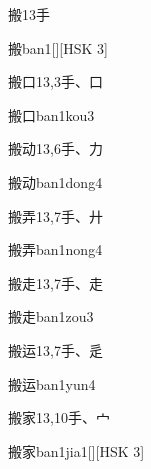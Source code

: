 \begin{entry}{搬}{13}{⼿}
  \begin{phonetics}{搬}{ban1}[][HSK 3]
  \end{phonetics}
\end{entry}

\begin{entry}{搬口}{13,3}{⼿、⼝}
  \begin{phonetics}{搬口}{ban1kou3}
  \end{phonetics}
\end{entry}

\begin{entry}{搬动}{13,6}{⼿、⼒}
  \begin{phonetics}{搬动}{ban1dong4}
  \end{phonetics}
\end{entry}

\begin{entry}{搬弄}{13,7}{⼿、⼶}
  \begin{phonetics}{搬弄}{ban1nong4}
  \end{phonetics}
\end{entry}

\begin{entry}{搬走}{13,7}{⼿、⾛}
  \begin{phonetics}{搬走}{ban1zou3}
  \end{phonetics}
\end{entry}

\begin{entry}{搬运}{13,7}{⼿、⾡}
  \begin{phonetics}{搬运}{ban1yun4}
  \end{phonetics}
\end{entry}

\begin{entry}{搬家}{13,10}{⼿、⼧}
  \begin{phonetics}{搬家}{ban1jia1}[][HSK 3]
  \end{phonetics}
\end{entry}

